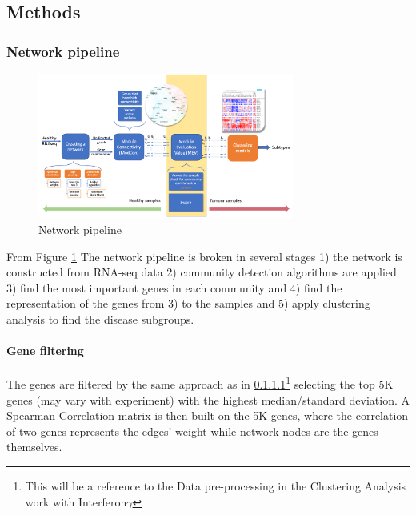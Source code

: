 \subsection{Methods} 

\subsubsection{Network pipeline}


\begin{figure}[!htb]
    \centering\includegraphics[width=0.75\textwidth,height=0.75\textheight,keepaspectratio]{Sections/Network_I/Resources/Methods/network_pipeline.png}
    \caption{Network pipeline}
    \label{fig:N_I:network_pipeline}
\end{figure}


From Figure \ref{fig:N_I:network_pipeline} The network pipeline is broken in several stages 1) the network is constructed from RNA-seq data 2) community detection algorithms are applied 3) find the most important genes in each community and 4) find the representation of the genes from 3) to the samples and 5) apply clustering analysis to find the disease subgroups.


\paragraph{Gene filtering}
The genes are filtered by the same approach as in \ref{}\footnote{This will be a reference to the Data pre-processing in the Clustering Analysis work with Interferon$\gamma$} selecting the top 5K genes (may vary with experiment) with the highest median/standard deviation. A Spearman Correlation matrix is then built on the 5K genes, where the correlation of two genes represents the edges' weight while network nodes are the genes themselves. 

